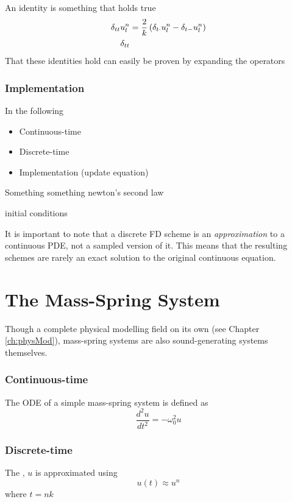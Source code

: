 An identity is something that holds true 
\begin{subequations}
    \begin{align}
        \delta_{tt} u_l^n &= \frac{2}{k}\left(\delta_{t\cdot} u_l^n - \delta_{t-} u_l^n\right)\\
        \delta_{tt} &
    \end{align}
\end{subequations}
That these identities hold can easily be proven by expanding the operators
\subsubsection{Implementation}
In the following 
\begin{itemize}
    \item Continuous-time
    \item Discrete-time
    \item Implementation (update equation)
\end{itemize}


Something something newton's second law

initial conditions

It is important to note that a discrete FD scheme is an \textit{approximation} to a continuous PDE, not a sampled version of it. This means that the resulting schemes are rarely an exact solution to the original continuous equation.

\section{%
The Mass-Spring System}
Though a complete physical modelling field on its own (see Chapter \ref{ch:physMod}), mass-spring systems are also sound-generating systems themselves.

\subsubsection{Continuous-time}
The ODE of a simple mass-spring system is defined as
\begin{equation}\label{eq:massSpringPDE}
    \frac{d^2u}{dt^2} = -\omega_0^2u
\end{equation}

\subsubsection{Discrete-time}
The , $u$ is approximated using 
\begin{equation}
    u(t) \approx u^n
\end{equation}
where $t = nk$

